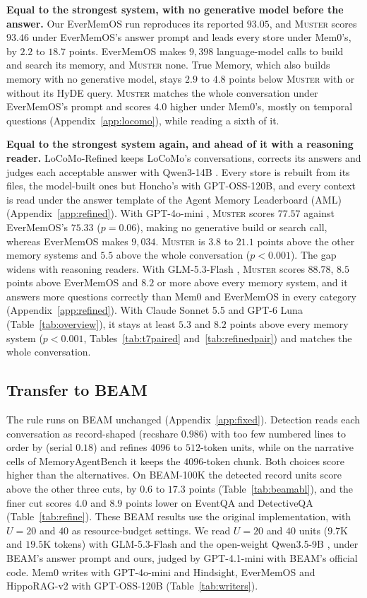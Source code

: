 \documentclass{article}
\newcommand{\sys}{\textsc{Muster}}
\newcommand{\serial}{\textsf{serial}}
\newcommand{\cov}{\textsf{recshare}}
\begin{document}
\textbf{Equal to the strongest system, with no generative model before the answer.} Our EverMemOS run reproduces its reported $93.05$, and \sys{} scores $93.46$ under EverMemOS's answer prompt and leads every store under Mem0's, by $2.2$ to $18.7$ points. EverMemOS makes $9{,}398$ language-model calls to build and search its memory, and \sys{} none. True Memory, which also builds memory with no generative model, stays $2.9$ to $4.8$ points below \sys{} with or without its HyDE query. \sys{} matches the whole conversation under EverMemOS's prompt and scores $4.0$ higher under Mem0's, mostly on temporal questions (Appendix~\ref{app:locomo}), while reading a sixth of it.

\textbf{Equal to the strongest system again, and ahead of it with a reasoning reader.} LoCoMo-Refined \cite{locomorefined} keeps LoCoMo's conversations, corrects its answers and judges each acceptable answer with Qwen3-14B \cite{qwen3}. Every store is rebuilt from its files, the model-built ones but Honcho's with GPT-OSS-120B, and every context is read under the answer template of the Agent Memory Leaderboard (AML) \cite{aml} (Appendix~\ref{app:refined}). With GPT-4o-mini \cite{gpt4omini}, \sys{} scores $77.57$ against EverMemOS's $75.33$ ($p=0.06$), making no generative build or search call, whereas EverMemOS makes $9{,}034$. \sys{} is $3.8$ to $21.1$ points above the other memory systems and $5.5$ above the whole conversation ($p<0.001$). The gap widens with reasoning readers. With GLM-5.3-Flash \cite{glm5}, \sys{} scores $88.78$, $8.5$ points above EverMemOS and $8.2$ or more above every memory system, and it answers more questions correctly than Mem0 and EverMemOS in every category (Appendix~\ref{app:refined}). With Claude Sonnet 5.5 \cite{sonnet55} and GPT-6 Luna \cite{gpt6luna} (Table~\ref{tab:overview}), it stays at least $5.3$ and $8.2$ points above every memory system ($p<0.001$, Tables~\ref{tab:t7paired} and~\ref{tab:refinedpair}) and matches the whole conversation.

\subsection{Transfer to BEAM}\label{sec:beamscale}

The rule runs on BEAM \cite{beam} unchanged (Appendix~\ref{app:fixed}). Detection reads each conversation as record-shaped (\cov{} $0.986$) with too few numbered lines to order by (\serial{} $0.18$) and refines $4096$ to $512$-token units, while on the narrative cells of MemoryAgentBench it keeps the $4096$-token chunk. Both choices score higher than the alternatives. On BEAM-100K the detected record units score above the other three cuts, by $0.6$ to $17.3$ points (Table~\ref{tab:beamabl}), and the finer cut scores $4.0$ and $8.9$ points lower on EventQA and DetectiveQA (Table~\ref{tab:refine}). These BEAM results use the original implementation, with $U=20$ and $40$ as resource-budget settings. We read $U=20$ and $40$ units ($9.7$K and $19.5$K tokens) with GLM-5.3-Flash \cite{glm5} and the open-weight Qwen3.5-9B \cite{qwen35}, under BEAM's answer prompt and ours, judged by GPT-4.1-mini with BEAM's official code. Mem0 writes with GPT-4o-mini and Hindsight, EverMemOS and HippoRAG-v2 with GPT-OSS-120B (Table~\ref{tab:writers}).
\end{document}
